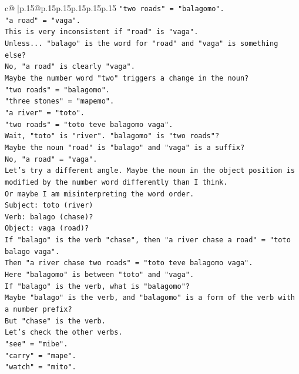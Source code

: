 \documentclass{article}
\begin{document}
{\begin{supertabular}{c@{$\;$}|p{.15\linewidth}@{}p{.15\linewidth}p{.15\linewidth}p{.15\linewidth}p{.15\linewidth}p{.15\linewidth}}
{{{\texttt{"two roads" = "balagomo".} \\
\texttt{"a road" = "vaga".} \\
\texttt{This is very inconsistent if "road" is "vaga".} \\
\texttt{Unless... "balago" is the word for "road" and "vaga" is something else?} \\
\texttt{No, "a road" is clearly "vaga".} \\
\texttt{Maybe the number word "two" triggers a change in the noun?} \\
\texttt{"two roads" = "balagomo".} \\
\texttt{"three stones" = "mapemo".} \\
\texttt{"a river" = "toto".} \\
\texttt{"two roads" = "toto teve balagomo vaga".} \\
\texttt{Wait, "toto" is "river". "balagomo" is "two roads"?} \\
\texttt{Maybe the noun "road" is "balago" and "vaga" is a suffix?} \\
\texttt{No, "a road" = "vaga".} \\
\texttt{Let's try a different angle. Maybe the noun in the object position is modified by the number word differently than I think.} \\
\texttt{Or maybe I am misinterpreting the word order.} \\
\texttt{Subject: toto (river)} \\
\texttt{Verb: balago (chase)?} \\
\texttt{Object: vaga (road)?} \\
\texttt{If "balago" is the verb "chase", then "a river chase a road" = "toto balago vaga".} \\
\texttt{Then "a river chase two roads" = "toto teve balagomo vaga".} \\
\texttt{Here "balagomo" is between "toto" and "vaga".} \\
\texttt{If "balago" is the verb, what is "balagomo"?} \\
\texttt{Maybe "balago" is the verb, and "balagomo" is a form of the verb with a number prefix?} \\
\texttt{But "chase" is the verb.} \\
\texttt{Let's check the other verbs.} \\
\texttt{"see" = "mibe".} \\
\texttt{"carry" = "mape".} \\
\texttt{"watch" = "mito".} \\
}}}
\end{supertabular}}
\end{document}
